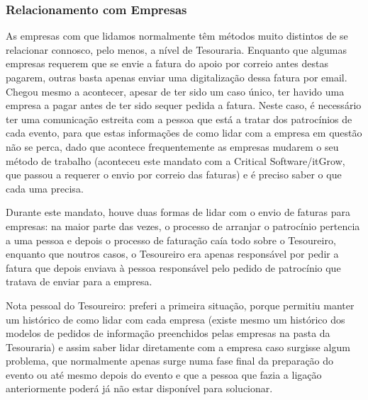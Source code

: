 
\subsubsection{Relacionamento com Empresas}

As empresas com que lidamos normalmente têm métodos muito distintos de se relacionar connosco, pelo menos, a nível de Tesouraria. Enquanto que algumas empresas requerem que se envie a fatura do apoio por correio antes destas pagarem, outras basta apenas enviar uma digitalização dessa fatura por email. Chegou mesmo a acontecer, apesar de ter sido um caso único, ter havido uma empresa a pagar antes de ter sido sequer pedida a fatura. Neste caso, é necessário ter uma comunicação estreita com a pessoa que está a tratar dos patrocínios de cada evento, para que estas informações de como lidar com a empresa em questão não se perca, dado que acontece frequentemente as empresas mudarem o seu método de trabalho (aconteceu este mandato com a Critical Software/itGrow, que passou a requerer o envio por correio das faturas) e é preciso saber o que cada uma precisa.

Durante este mandato, houve duas formas de lidar com o envio de faturas para empresas: na maior parte das vezes, o processo de arranjar o patrocínio pertencia a uma pessoa e depois o processo de faturação caía todo sobre o Tesoureiro, enquanto que noutros casos, o Tesoureiro era apenas responsável por pedir a fatura que depois enviava à pessoa responsável pelo pedido de patrocínio que tratava de enviar para a empresa. 

Nota pessoal do Tesoureiro: preferi a primeira situação, porque permitiu manter um histórico de como lidar com cada empresa (existe mesmo um histórico dos modelos de pedidos de informação preenchidos pelas empresas na pasta da Tesouraria) e assim saber lidar diretamente com a empresa caso surgisse algum problema, que normalmente apenas surge numa fase final da preparação do evento ou até mesmo depois do evento e que a pessoa que fazia a ligação anteriormente poderá já não estar disponível para solucionar.

